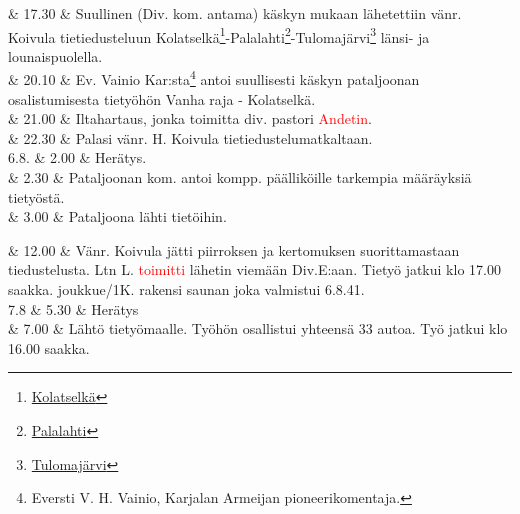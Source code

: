 \documentclass[11pt,a5paper,oneside]{book}
\begin{document}

& 17.30 & Suullinen (Div. kom. antama) käskyn mukaan lähetettiin vänr. Koivula tietiedusteluun Kolatselkä\footnote{\href{https://www.google.fi/maps/place/Kolatsel'ga,+Republic+of+Karelia,+Russia,+186148/}{Kolatselkä}}-Palalahti\footnote{\href{https://www.google.fi/maps/place/Palalakhta,+Republic+of+Karelia,+Russia,+186148/}{Palalahti}}-Tulomajärvi\footnote{\href{https://www.google.fi/maps/place/Ozero+Tulmozero/}{Tulomajärvi}} länsi- ja lounaispuolella. \newline \\

& 20.10 & Ev. Vainio Kar:sta\footnote{Eversti V. H. Vainio, Karjalan Armeijan pioneerikomentaja.} antoi suullisesti käskyn pataljoonan osalistumisesta tietyöhön Vanha raja - Kolatselkä. \\

& 21.00 & Iltahartaus, jonka toimitta div. pastori \textcolor{red}{Andetin}. \\

& 22.30 & Palasi vänr. H. Koivula tietiedustelumatkaltaan. \newline\newline\newline\newline\newline \\

6.8. & 2.00 & Herätys. \\

& 2.30 & Pataljoonan kom. antoi kompp. päälliköille tarkempia määräyksiä tietyöstä. \\

& 3.00 & Pataljoona lähti tietöihin. \\
\newpage

& 12.00 & Vänr. Koivula jätti piirroksen ja kertomuksen suorittamastaan tiedustelusta. Ltn L. \textcolor{red}{toimitti} lähetin viemään Div.E:aan. Tietyö jatkui klo 17.00 saakka.  joukkue/1K. rakensi saunan joka valmistui 6.8.41. \newline\newline \\

7.8 & 5.30 & Herätys \\

& 7.00 & Lähtö tietyömaalle. Työhön osallistui yhteensä 33 autoa. \newline Työ jatkui klo 16.00 saakka. \\
\end{document}
